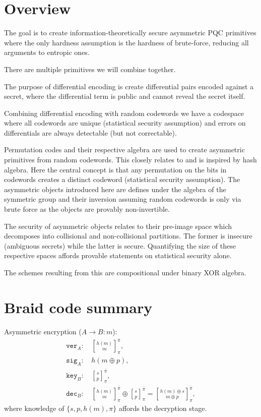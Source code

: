 \documentclass[twocolumn, aps, amsmath, amssymb, nofootinbib, superscriptaddress, longbibliography, doublefloatfix, table-of-contents, eqsecnum, rmp]{revtex4-2}
\newcommand{\stackbraid}[2]{{\genfrac{[}{]}{0pt}{}{{#1}}{{#2}}}^{\bar{\pi}}_{\pi}}
\begin{document}
\section{Overview}

The goal is to create information-theoretically secure asymmetric PQC primitives where the only hardness assumption is the hardness of brute-force, reducing all arguments to entropic ones.

There are multiple primitives we will combine together.

The purpose of differential encoding is create differential pairs encoded against a secret, where the differential term is public and cannot reveal the secret itself.

Combining differential encoding with random codewords we have a codespace where all codewords are unique (statistical security assumption) and errors on differentials are always detectable (but not correctable).

Permutation codes and their respective algebra are used to create asymmetric primitives from random codewords. This closely relates to and is inspired by hash algebra. Here the central concept is that any permutation on the bits in codewords creates a distinct codeword (statistical security assumption). The asymmetric objects introduced here are defines under the algebra of the symmetric group and their inversion assuming random codewords is only via brute force as the objects are provably non-invertible.

The security of asymmetric objects relates to their pre-image space which decomposes into collisional and non-collisional partitions. The former is insecure (ambiguous secrets) while the latter is secure. Quantifying the size of these respective spaces affords provable statements on statistical security alone.

The schemes resulting from this are compositional under binary XOR algebra.

\section{Braid code summary}

Asymmetric encryption ($A\to B: m$):
\begin{align}
	\mathtt{ver}_A:\, &\stackbraid{h(m)}{m},\nonumber\\
	\mathtt{sig}_A:\, &h(m\oplus p),\nonumber\\
	\mathtt{key}_B:\, &\stackbraid{s}{p},\nonumber\\
	\mathtt{dec}_B:\, &\stackbraid{h(m)}{m}\oplus \stackbraid{s}{p} = \stackbraid{h(m)\oplus s}{m\oplus p},
\end{align}
where knowledge of $\{s,p,h(m),\pi\}$ affords the decryption stage.
\end{document}
